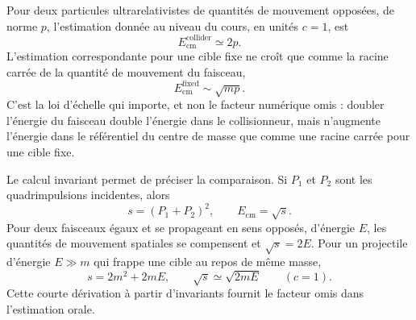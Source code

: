 Pour deux particules ultrarelativistes de quantités de mouvement opposées, de norme \(p\), l’estimation donnée au niveau du cours, en unités \(c=1\), est
\begin{equation}
E_{\mathrm{cm}}^{\mathrm{collider}}\simeq 2p.
\end{equation}
L’estimation correspondante pour une cible fixe ne croît que comme la racine carrée de la quantité de mouvement du faisceau,
\begin{equation}
E_{\mathrm{cm}}^{\mathrm{fixed}}\sim \sqrt{mp}.
\end{equation}
C’est la loi d’échelle qui importe, et non le facteur numérique omis : doubler l’énergie du faisceau double l’énergie dans le collisionneur, mais n’augmente l’énergie dans le référentiel du centre de masse que comme une racine carrée pour une cible fixe.

Le calcul invariant permet de préciser la comparaison. Si \(P_1\) et \(P_2\) sont les quadrimpulsions incidentes, alors
\begin{equation}
s=(P_1+P_2)^2,
\qquad E_{\mathrm{cm}}=\sqrt{s}.
\end{equation}
Pour deux faisceaux égaux et se propageant en sens opposés, d’énergie \(E\), les quantités de mouvement spatiales se compensent et \(\sqrt{s}=2E\). Pour un projectile d’énergie \(E\gg m\) qui frappe une cible au repos de même masse,
\begin{equation}
s=2m^2+2mE,
\qquad
\sqrt{s}\simeq \sqrt{2mE}
\qquad (c=1).
\end{equation}
Cette courte dérivation à partir d’invariants fournit le facteur omis dans l’estimation orale.

\begin{classroomqa}\end{classroomqa}

